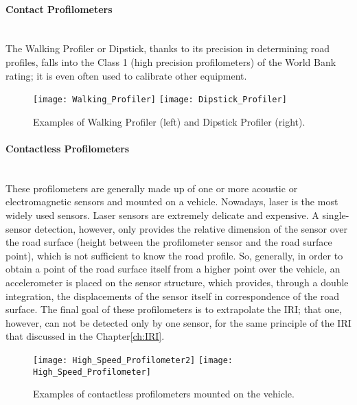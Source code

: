 \documentclass[tesi]{subfiles}
\begin{document}
\begin{enumerate}
\begin{description}
\end{description}

\paragraph{Contact Profilometers}\leavevmode\\
The Walking Profiler or Dipstick\cite{little_book}, thanks to its precision in determining road profiles, falls into the Class 1 (high precision profilometers) of the World Bank rating\cite{sayers1995calculation}; it is even often used to calibrate other equipment.


\begin{figure}[H]
\centering
\texttt{[image: Walking\_Profiler]}
\hspace{1.5cm}
\texttt{[image: Dipstick\_Profiler]}
\caption{Examples of Walking Profiler (left) and Dipstick Profiler (right).}
\label{fig:contact_profiler}
\end{figure}

\paragraph{Contactless Profilometers}\leavevmode\\  These profilometers are generally made up of one or more acoustic or electromagnetic sensors and mounted on a vehicle. Nowadays, laser is the most widely used sensors.
Laser sensors are extremely delicate and expensive. A single-sensor detection, however, only provides the relative dimension of the sensor over the road surface (height between the profilometer sensor and the road surface point), which is not sufficient to know the road profile. So, generally, in order to obtain a point of the road surface itself from a higher point over the vehicle, an accelerometer is placed on the sensor structure, which provides, through a double integration, the displacements of the sensor itself in correspondence of the road surface. The final goal of these profilometers is to extrapolate the IRI; that one, however, can not be detected only by one sensor, for the same principle of the IRI that discussed in the Chapter\ref{ch:IRI}.

\vspace{0.35cm}
\begin{figure}[H]
\centering
\texttt{[image: High\_Speed\_Profilometer2]}
\hspace{1cm}
\texttt{[image: High\_Speed\_Profilometer]}
\caption{Examples of contactless profilometers mounted on the vehicle.}
\label{fig:contact_less_profiler}
\end{figure}


\end{enumerate}
\end{document}
